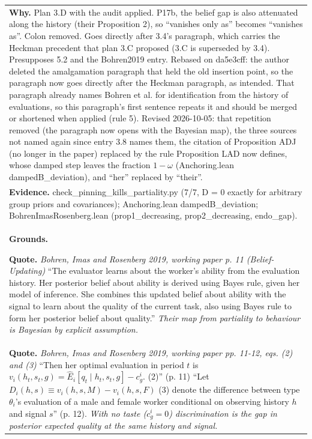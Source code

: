 \documentclass[10pt]{article}
\theoremstyle{definition}
\newlength{\fullw}\setlength{\fullw}{25.9cm}
\begin{document}
{\begin{longtable}{|p{0.9cm}|p{12.2cm}|p{12.2cm}|}
\multicolumn{3}{|p{\fullw}|}{\textbf{Why.} Plan 3.D with the audit applied. P17b, the belief gap is also attenuated along the history (their Proposition 2), so ``vanishes only as'' becomes ``vanishes as''. Colon removed. Goes directly after 3.4's paragraph, which carries the Heckman precedent that plan 3.C proposed (3.C is superseded by 3.4). Presupposes 5.2 and the Bohren2019 entry. Rebased on da5e3cff: the author deleted the amalgamation paragraph that held the old insertion point, so the paragraph now goes directly after the Heckman paragraph, as intended. That paragraph already names Bohren et al. for identification from the history of evaluations, so this paragraph's first sentence repeats it and should be merged or shortened when applied (rule 5). Revised 2026-10-05: that repetition removed (the paragraph now opens with the Bayesian map), the three sources not named again since entry 3.8 names them, the citation of Proposition ADJ (no longer in the paper) replaced by the rule Proposition LAD now defines, whose damped step leaves the fraction $1-\omega$ (Anchoring.lean dampedB\_deviation), and ``her'' replaced by ``their''.} \\
\multicolumn{3}{|p{\fullw}|}{\textbf{Evidence.} check\_pinning\_kills\_partiality.py (7/7, D = 0 exactly for arbitrary group priors and covariances); Anchoring.lean dampedB\_deviation; BohrenImasRosenberg.lean (prop1\_decreasing, prop2\_decreasing, endo\_gap).} \\ \hline
\multicolumn{3}{|p{\fullw}|}{\textbf{Grounds.}\par \textbf{Quote.} \textit{Bohren, Imas and Rosenberg 2019, working paper p. 11 (Belief-Updating)} \newline ``The evaluator learns about the worker's ability from the evaluation history. Her posterior belief about ability is derived using Bayes rule, given her model of inference. She combines this updated belief about ability with the signal to learn about the quality of the current task, also using Bayes rule to form her posterior belief about quality.'' \newline \textit{Their map from partiality to behaviour is Bayesian by explicit assumption.}} \\
\multicolumn{3}{|p{\fullw}|}{\textbf{Quote.} \textit{Bohren, Imas and Rosenberg 2019, working paper pp. 11-12, eqs. (2) and (3)} \newline ``Then her optimal evaluation in period $t$ is $v_i(h_t,s_t,g) = \hat{E}_i[q_t \mid h_t,s_t,g] - c^i_g$. (2)'' (p. 11) ``Let $D_i(h,s) \equiv v_i(h,s,M) - v_i(h,s,F)$ (3) denote the difference between type $\theta_i$'s evaluation of a male and female worker conditional on observing history $h$ and signal $s$'' (p. 12). \newline \textit{With no taste ($c^i_g = 0$) discrimination is the gap in posterior expected quality at the same history and signal.}} \\

\end{longtable}}
\end{document}
